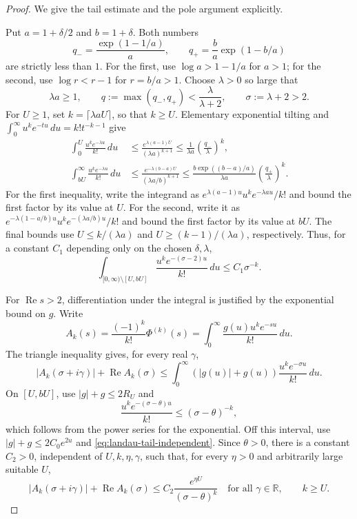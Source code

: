 \documentclass[11pt,a4paper]{article}
\theoremstyle{remark}
\newcommand{\R}{\mathbb R}
\DeclareMathOperator{\Rea}{Re}
\begin{document}
\begin{proof}
We give the tail estimate and the pole argument explicitly.

Put $a=1+\delta/2$ and $b=1+\delta$. Both numbers
\[
 q_- = \frac{\exp(1-1/a)}{a},\qquad
 q_+ = \frac ba\exp(1-b/a)
\]
are strictly less than $1$. For the first, use
$\log a>1-1/a$ for $a>1$; for the second, use
$\log r<r-1$ for $r=b/a>1$. Choose $\lambda>0$ so large that
\[
 \lambda a\ge1,\qquad
 q:=\max(q_-,q_+)<\frac{\lambda}{\lambda+2},
 \qquad \sigma:=\lambda+2>2.
\]
For $U\ge1$, set $k=\lceil\lambda aU\rceil$, so that $k\ge U$.
Elementary exponential tilting and
$\int_0^\infty u^ke^{-tu}\,du=k!t^{-k-1}$ give
\begin{align*}
 \int_0^U\frac{u^ke^{-\lambda u}}{k!}\,du
 &\le \frac{e^{\lambda(a-1)U}}{(\lambda a)^{k+1}}
 \le \frac1{\lambda a}\left(\frac{q_-}{\lambda}\right)^k,\\
 \int_{bU}^\infty\frac{u^ke^{-\lambda u}}{k!}\,du
 &\le \frac{e^{-\lambda(b-a)U}}{(\lambda a/b)^{k+1}}
 \le \frac{b\exp((b-a)/a)}{\lambda a}
          \left(\frac{q_+}{\lambda}\right)^k.
\end{align*}
For the first inequality, write the integrand as
$e^{\lambda(a-1)u}u^ke^{-\lambda au}/k!$ and bound the first factor
by its value at $U$. For the second, write it as
$e^{-\lambda(1-a/b)u}u^ke^{-(\lambda a/b)u}/k!$ and bound the first
factor by its value at $bU$. The final bounds use
$U\le k/(\lambda a)$ and $U\ge(k-1)/(\lambda a)$, respectively.
Thus, for a constant $C_1$ depending only on the chosen $\delta,\lambda$,
\begin{equation}\label{eq:landau-tail-independent}
 \int_{[0,\infty)\setminus[U,bU]}
      \frac{u^ke^{-(\sigma-2)u}}{k!}\,du
 \le C_1\sigma^{-k}.
\end{equation}

For $\Rea s>2$, differentiation under the integral is justified by
the exponential bound on $g$. Write
\[
 A_k(s)=\frac{(-1)^k}{k!}\Phi^{(k)}(s)
       =\int_0^\infty\frac{g(u)u^ke^{-su}}{k!}\,du.
\]
The triangle inequality gives, for every real $\gamma$,
\[
 |A_k(\sigma+i\gamma)|+\Rea A_k(\sigma)
 \le\int_0^\infty (|g(u)|+g(u))
               \frac{u^ke^{-\sigma u}}{k!}\,du.
\]
On $[U,bU]$, use $|g|+g\le2R_U$ and
\[
 \frac{u^ke^{-(\sigma-\theta)u}}{k!}
 \le(\sigma-\theta)^{-k},
\]
which follows from the power series for the exponential.
Off this interval, use $|g|+g\le2C_0e^{2u}$ and
\eqref{eq:landau-tail-independent}. Since $\theta>0$, there is a constant
$C_2>0$, independent of $U,k,\eta,\gamma$, such that, for every
$\eta>0$ and arbitrarily large suitable $U$,
\begin{equation}\label{eq:landau-coeff-independent}
 |A_k(\sigma+i\gamma)|+\Rea A_k(\sigma)
 \le C_2\frac{e^{\eta U}}{(\sigma-\theta)^k}
 \quad\text{for all }\gamma\in\R,
 \qquad k\ge U.
\end{equation}


\end{proof}
\end{document}
